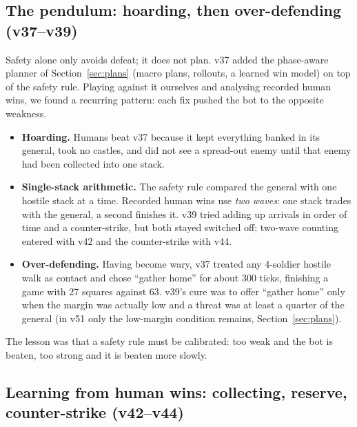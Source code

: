 \subsection{The pendulum: hoarding, then over-defending (v37--v39)}

Safety alone only avoids defeat; it does not plan. v37 added the phase-aware planner of Section~\ref{sec:plans}
(macro plans, rollouts, a learned win model) on top of the safety rule. Playing against it ourselves and
analysing recorded human wins, we found a recurring pattern: each fix pushed the bot to the opposite weakness.
\begin{itemize}
\item \textbf{Hoarding.} Humans beat v37 because it kept everything banked in its general, took no castles, and
did not see a spread-out enemy until that enemy had been collected into one stack.
\item \textbf{Single-stack arithmetic.} The safety rule compared the general with one hostile stack at a time.
Recorded human wins use \emph{two waves}: one stack trades with the general, a second finishes it. v39 tried
adding up arrivals in order of time and a counter-strike, but both stayed switched off; two-wave counting
entered with v42 and the counter-strike with v44.
\item \textbf{Over-defending.} Having become wary, v37 treated any 4-soldier hostile walk as contact and chose
``gather home'' for about 300 ticks, finishing a game with 27 squares against 63. v39's cure was to offer
``gather home'' only when the margin was actually low and a threat was at least a quarter of the general (in v51
only the low-margin condition remains, Section~\ref{sec:plans}).
\end{itemize}
The lesson was that a safety rule must be calibrated: too weak and the bot is beaten, too strong and it is beaten
more slowly.

\subsection{Learning from human wins: collecting, reserve, counter-strike (v42--v44)}

